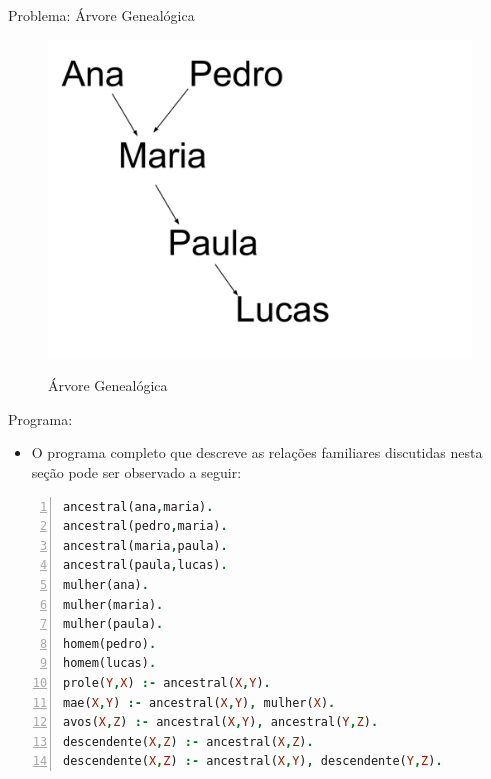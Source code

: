 \documentclass[sans]{beamer}
\begin{document}
\begin{frame}[fragile]
\begin{block}{Problema: Árvore Genealógica}
\begin{figure}[!htb]

\centering
\includegraphics[scale = 0.17]{figuras/ArvoreProlog.pdf}
\label{fig_functor_termo}
\caption{Árvore Genealógica}

\end{figure}
\end{block}
\end{frame}

\begin{frame}[fragile]
\begin{block}{Programa:}
\begin{itemize}
 \item O programa completo que descreve as relações familiares discutidas nesta seção pode
ser observado a seguir:
\end{itemize}

\begin{lstlisting}[language=Prolog, 
                   basicstyle=\footnotesize\ttfamily,
                  backgroundcolor=\color{azulclaro}, 
                  keywordstyle=\color{red},   
                  keepspaces=true,    
                  keywordstyle=\color{magenta},
     numberstyle=\tiny\color{magenta},
     commentstyle=\color{green},             
    numbers=left,                    
    numbersep=5pt]
ancestral(ana,maria).
ancestral(pedro,maria).
ancestral(maria,paula).
ancestral(paula,lucas).
mulher(ana).
mulher(maria).
mulher(paula).
homem(pedro).
homem(lucas).
prole(Y,X) :- ancestral(X,Y).
mae(X,Y) :- ancestral(X,Y), mulher(X). 
avos(X,Z) :- ancestral(X,Y), ancestral(Y,Z). 
descendente(X,Z) :- ancestral(X,Z).
descendente(X,Z) :- ancestral(X,Y), descendente(Y,Z).
\end{lstlisting}    

\end{block}
\end{frame}
\end{document}
